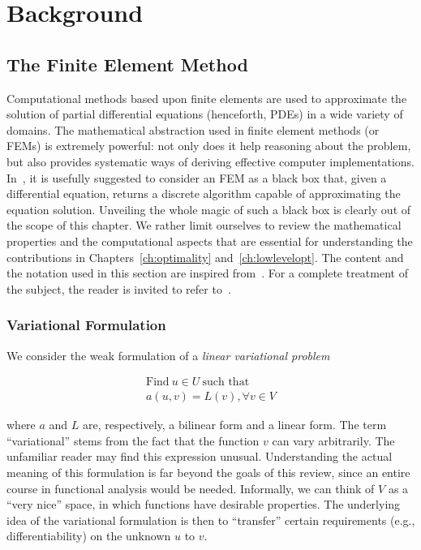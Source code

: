 \chapter{Background}

\section{The Finite Element Method}
\label{sec:bkg:fem}
Computational methods based upon finite elements are used to approximate the solution of partial differential equations (henceforth, PDEs) in a wide variety of domains. The mathematical abstraction used in finite element methods (or FEMs) is extremely powerful: not only does it help reasoning about the problem, but also provides systematic ways of deriving effective computer implementations. In~\cite{brenner-and-scott}, it is usefully suggested to consider an FEM as a black box that, given a differential equation, returns a discrete algorithm capable of approximating the equation solution. Unveiling the whole magic of such a black box is clearly out of the scope of this chapter. We rather limit ourselves to review the mathematical properties and the computational aspects that are essential for understanding the contributions in Chapters~\ref{ch:optimality} and~\ref{ch:lowlevelopt}. The content and the notation used in this section are inspired from~\cite{florian-thesis,kirby-and-logg,olgaard-and-wells}. For a complete treatment of the subject, the reader is invited to refer to~\cite{brenner-and-scott}.



\subsection{Variational Formulation}
\label{sec:bkg:var-problems}
We consider the weak formulation of a {\em linear variational problem}

\begin{equation}
\begin{split}
\text{Find}\ u \in U\ \text{such that} \\
a(u, v) = L(v), \forall v \in V
\end{split}
\end{equation}

where $a$ and $L$ are, respectively, a bilinear form and a linear form. The term ``variational'' stems from the fact that the function $v$ can vary arbitrarily. The unfamiliar reader may find this expression unusual. Understanding the actual meaning of this formulation is far beyond the goals of this review, since an entire course in functional analysis would be needed. Informally, we can think of $V$ as a ``very nice'' space, in which functions have desirable properties. The underlying idea of the variational formulation is then to ``transfer'' certain requirements (e.g., differentiability) on the unknown $u$ to $v$.

